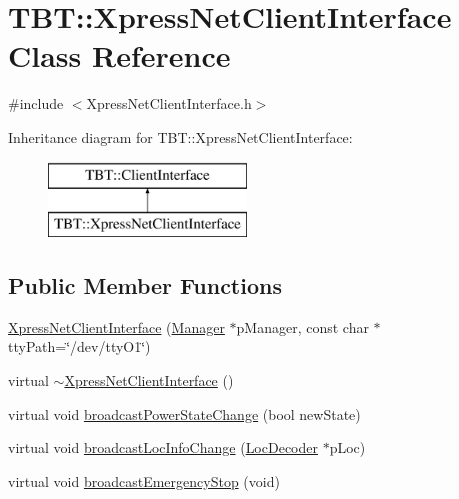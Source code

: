 \hypertarget{classTBT_1_1XpressNetClientInterface}{}\section{T\+BT\+:\+:Xpress\+Net\+Client\+Interface Class Reference}
\label{classTBT_1_1XpressNetClientInterface}


{\ttfamily \#include $<$Xpress\+Net\+Client\+Interface.\+h$>$}

Inheritance diagram for T\+BT\+:\+:Xpress\+Net\+Client\+Interface\+:\begin{figure}[H]
\begin{center}
\leavevmode
\includegraphics[height=2.000000cm]{classTBT_1_1XpressNetClientInterface}
\end{center}
\end{figure}
\subsection*{Public Member Functions}
\begin{DoxyCompactItemize}
\item 
\hyperlink{classTBT_1_1XpressNetClientInterface_afc3950ffc2b045e653c539a57967aa57_afc3950ffc2b045e653c539a57967aa57}{Xpress\+Net\+Client\+Interface} (\hyperlink{classTBT_1_1Manager}{Manager} $\ast$p\+Manager, const char $\ast$tty\+Path=\char`\"{}/dev/tty\+O1\char`\"{})
\item 
virtual \hyperlink{classTBT_1_1XpressNetClientInterface_a83f7c569ae4f17e8d9c06671166e635f_a83f7c569ae4f17e8d9c06671166e635f}{$\sim$\+Xpress\+Net\+Client\+Interface} ()
\item 
virtual void \hyperlink{classTBT_1_1XpressNetClientInterface_a338da1925ec68f197e87625c7497f472_a338da1925ec68f197e87625c7497f472}{broadcast\+Power\+State\+Change} (bool new\+State)
\item 
virtual void \hyperlink{classTBT_1_1XpressNetClientInterface_a8e64404cb84913c2d9290d2afb882b39_a8e64404cb84913c2d9290d2afb882b39}{broadcast\+Loc\+Info\+Change} (\hyperlink{classTBT_1_1LocDecoder}{Loc\+Decoder} $\ast$p\+Loc)
\item 
virtual void \hyperlink{classTBT_1_1XpressNetClientInterface_a143641241f4830f22ec5beb78036ce4c_a143641241f4830f22ec5beb78036ce4c}{broadcast\+Emergency\+Stop} (void)
\end{DoxyCompactItemize}
